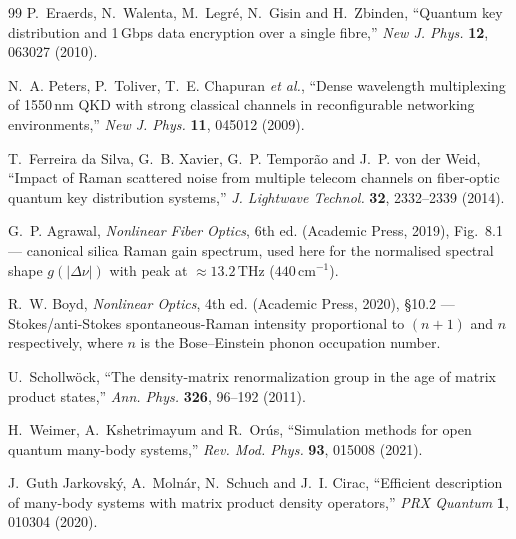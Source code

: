 \documentclass[11pt]{article}
\begin{document}
\begin{thebibliography}{99}
 P.~Eraerds, N.~Walenta, M.~Legr\'e, N.~Gisin and H.~Zbinden,
``Quantum key distribution and 1\,Gbps data encryption over a single fibre,''
\emph{New J. Phys.} \textbf{12}, 063027 (2010).

 N.~A. Peters, P.~Toliver, T.~E. Chapuran \emph{et al.},
``Dense wavelength multiplexing of 1550\,nm QKD with strong classical channels in
reconfigurable networking environments,''
\emph{New J. Phys.} \textbf{11}, 045012 (2009).

 T.~Ferreira da Silva, G.~B. Xavier, G.~P. Tempor\~ao and
J.~P. von der Weid, ``Impact of Raman scattered noise from multiple telecom channels on
fiber-optic quantum key distribution systems,''
\emph{J. Lightwave Technol.} \textbf{32}, 2332--2339 (2014).

 G.~P. Agrawal,
\emph{Nonlinear Fiber Optics}, 6th ed. (Academic Press, 2019),
Fig.~8.1 — canonical silica Raman gain spectrum, used here for the normalised
spectral shape $g(|\Delta\nu|)$ with peak at ${\approx}13.2\,\mathrm{THz}$ ($440\,\mathrm{cm}^{-1}$).

 R.~W. Boyd,
\emph{Nonlinear Optics}, 4th ed. (Academic Press, 2020), \S10.2 —
Stokes/anti-Stokes spontaneous-Raman intensity proportional to $(n+1)$ and $n$ respectively,
where $n$ is the Bose--Einstein phonon occupation number.

 U.~Schollw\"ock,
``The density-matrix renormalization group in the age of matrix product states,''
\emph{Ann. Phys.} \textbf{326}, 96--192 (2011).

 H.~Weimer, A.~Kshetrimayum and R.~Or\'us,
``Simulation methods for open quantum many-body systems,''
\emph{Rev. Mod. Phys.} \textbf{93}, 015008 (2021).

 J.~Guth Jarkovsk\'y, A.~Moln\'ar, N.~Schuch and J.~I. Cirac,
``Efficient description of many-body systems with matrix product density operators,''
\emph{PRX Quantum} \textbf{1}, 010304 (2020).

\end{thebibliography}
\end{document}
